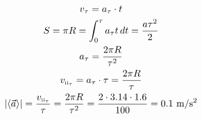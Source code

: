 \documentclass[a5paper,10pt]{article}
\newcommand{\average}[1]{\langle{#1}\rangle}
\newcommand{\RN}[1]{%
  \textup{\tiny\uppercase\expandafter{\romannumeral#1}}%
}
\begin{document}
\begin{gather*}
	v_\tau=a_\tau\cdot{t}\\
	S=\pi{R}=\int_0^\tau a_\tau{t}\,dt=\frac{a\tau^2}{2}\\
	a_\tau=\frac{2\pi{R}}{\tau^2}\\
	v_{\RN{2}_\tau}=a_\tau\cdot{\tau}=\frac{2\pi{R}}{\tau}\\
	|\average{\vec{a}}|=\frac{v_{\RN{2}_\tau}}{\tau}=\frac{2\pi{R}}{\tau^2}=
	\frac{2\cdot{}3.14\cdot{1.6}}{100}=0.1\text{ m/s$^2$}\\
\end{gather*}
\end{document}
